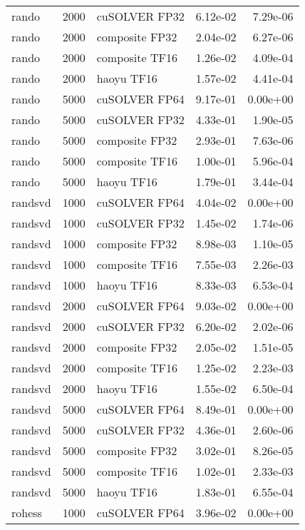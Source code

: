 \begin{table}
\begin{tabular}{lrlrr}
    rando &  2000 &  cuSOLVER FP32 &  6.12e-02 &        7.29e-06 \\
    rando &  2000 & composite FP32 &  2.04e-02 &        6.27e-06 \\
    rando &  2000 & composite TF16 &  1.26e-02 &        4.09e-04 \\
    rando &  2000 &     haoyu TF16 &  1.57e-02 &        4.41e-04 \\
    rando &  5000 &  cuSOLVER FP64 &  9.17e-01 &        0.00e+00 \\
    rando &  5000 &  cuSOLVER FP32 &  4.33e-01 &        1.90e-05 \\
    rando &  5000 & composite FP32 &  2.93e-01 &        7.63e-06 \\
    rando &  5000 & composite TF16 &  1.00e-01 &        5.96e-04 \\
    rando &  5000 &     haoyu TF16 &  1.79e-01 &        3.44e-04 \\
  randsvd &  1000 &  cuSOLVER FP64 &  4.04e-02 &        0.00e+00 \\
  randsvd &  1000 &  cuSOLVER FP32 &  1.45e-02 &        1.74e-06 \\
  randsvd &  1000 & composite FP32 &  8.98e-03 &        1.10e-05 \\
  randsvd &  1000 & composite TF16 &  7.55e-03 &        2.26e-03 \\
  randsvd &  1000 &     haoyu TF16 &  8.33e-03 &        6.53e-04 \\
  randsvd &  2000 &  cuSOLVER FP64 &  9.03e-02 &        0.00e+00 \\
  randsvd &  2000 &  cuSOLVER FP32 &  6.20e-02 &        2.02e-06 \\
  randsvd &  2000 & composite FP32 &  2.05e-02 &        1.51e-05 \\
  randsvd &  2000 & composite TF16 &  1.25e-02 &        2.23e-03 \\
  randsvd &  2000 &     haoyu TF16 &  1.55e-02 &        6.50e-04 \\
  randsvd &  5000 &  cuSOLVER FP64 &  8.49e-01 &        0.00e+00 \\
  randsvd &  5000 &  cuSOLVER FP32 &  4.36e-01 &        2.60e-06 \\
  randsvd &  5000 & composite FP32 &  3.02e-01 &        8.26e-05 \\
  randsvd &  5000 & composite TF16 &  1.02e-01 &        2.33e-03 \\
  randsvd &  5000 &     haoyu TF16 &  1.83e-01 &        6.55e-04 \\
   rohess &  1000 &  cuSOLVER FP64 &  3.96e-02 &        0.00e+00 \\

\end{tabular}
\end{table}
